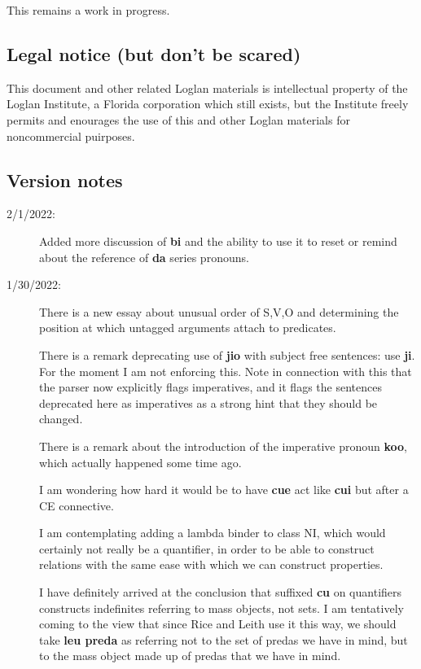 \documentclass[12pt]{book}
\begin{document}
This remains a work in progress.

\subsection{Legal notice (but don't be scared)}

This document and other related Loglan materials is intellectual property of the Loglan Institute, a Florida corporation which still exists, but the Institute freely permits and enourages the use of this and other Loglan materials for noncommercial puirposes.

\subsection{Version notes}

\begin{description}

\item[2/1/2022:]  Added more discussion of {\bf bi} and the ability to use it to reset or remind about the reference of {\bf da} series pronouns.

\item[1/30/2022:]  There is a new essay about unusual order of S,V,O and determining the position at which untagged arguments attach to predicates.

There is a remark deprecating use of {\bf jio} with subject free sentences:  use {\bf ji}.  For the moment I am not enforcing this.  Note in connection with this that the parser now explicitly flags imperatives, and it flags the sentences deprecated here as imperatives as a strong hint that they should be changed.

There is a remark about the introduction of the imperative pronoun {\bf koo}, which actually happened some time ago.

I am wondering how hard it would be to have {\bf cue} act like {\bf cui} but after a CE connective.

I am contemplating adding a lambda binder to class NI, which would certainly not really be a quantifier, in order to be able to construct relations with the same ease with which we can construct properties.

I have definitely arrived at the conclusion that suffixed {\bf cu} on quantifiers constructs indefinites referring to mass objects, not sets.  I am tentatively coming to the view that since Rice and Leith use it this way, we should take {\bf leu preda} as referring not to the set of predas we have in mind, but to the mass object made up of predas that we have in mind.


\end{description}
\end{document}
